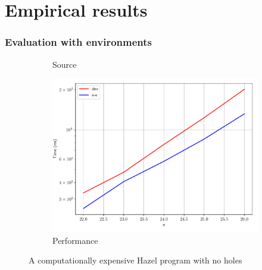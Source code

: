 \documentclass{beamer}
\begin{document}
\section{Empirical results}

\begin{frame}[allowframebreaks]
  \frametitle{Evaluation with environments}

  \begin{figure}
    \centering
    \begin{subfigure}[b]{0.45\textwidth}
      \centering
      \tiny
      \caption{Source}
      \label{fig:perf-fib}
    \end{subfigure}
    \qquad
    \begin{subfigure}[b]{0.45\textwidth}
      \includegraphics[width=\textwidth]{thesis/img/perf_fib.pdf}
      \caption{Performance}
      \label{fig:perf-fib-graph}
    \end{subfigure}
    \caption{A computationally expensive Hazel program with no holes}
  \end{figure}


\end{frame}
\end{document}
